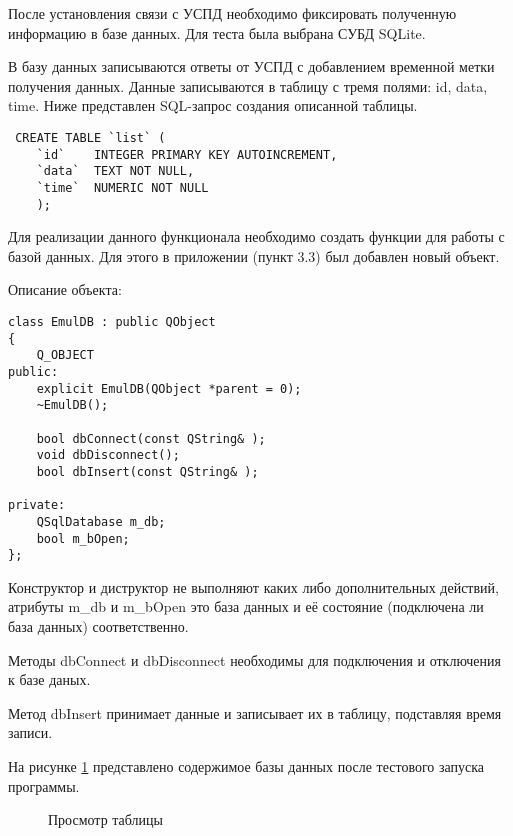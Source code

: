 После установления связи с УСПД необходимо фиксировать полученную информацию в базе данных. Для теста была выбрана СУБД SQLite. 

В базу данных записываются ответы от УСПД с добавлением временной метки получения данных. Данные записываются в таблицу с тремя полями: id, data, time. Ниже представлен SQL-запрос создания описанной таблицы.

\begin{lstlisting}
 CREATE TABLE `list` (
	`id`	INTEGER PRIMARY KEY AUTOINCREMENT,
	`data`	TEXT NOT NULL,
	`time`	NUMERIC NOT NULL
	);
\end{lstlisting}


Для реализации данного функционала необходимо создать функции для работы с базой данных. Для этого в приложении (пункт 3.3) был добавлен новый объект. 

Описание объекта:

\begin{lstlisting}
class EmulDB : public QObject
{
    Q_OBJECT
public:
    explicit EmulDB(QObject *parent = 0);
    ~EmulDB();

    bool dbConnect(const QString& );
    void dbDisconnect();
    bool dbInsert(const QString& );

private:
    QSqlDatabase m_db;
    bool m_bOpen;
};
\end{lstlisting}

Конструктор и диструктор не выполняют каких либо дополнительных действий, атрибуты m\_db и m\_bOpen это база данных и её состояние (подключена ли база данных) соответственно.

Методы dbConnect и dbDisconnect необходимы для подключения и отключения к базе даных. 

Метод dbInsert принимает данные и записывает их в таблицу, подставляя время записи.

На рисунке \ref{dBase:dBase} представлено содержимое базы данных после тестового запуска программы.

\begin{figure}[h!]
 \caption{Просмотр таблицы}
 \label{dBase:dBase}
\end{figure}